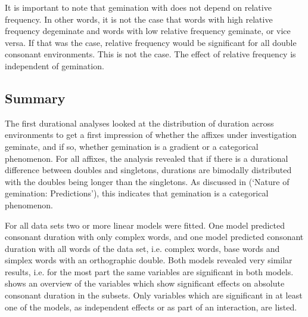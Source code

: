 It is important to note that gemination with  does not depend on relative frequency. In other words, it is not the case that words with high relative frequency degeminate and words with low relative frequency geminate, or vice versa. If that was the case, relative frequency would be significant for all double consonant environments. This is not the case. The effect of relative frequency is independent of gemination. 


\subsection{Summary} \label{discussion experiment}

The first durational analyses looked at the distribution of duration across environments to get a first impression of whether the affixes under investigation geminate, and if so, whether gemination is a gradient or a categorical phenomenon. 
For all affixes,  the analysis revealed that if there is a durational difference between doubles and singletons, durations are bimodally distributed with the doubles being longer than the singletons. As discussed in  (`Nature of gemination: Predictions'), this indicates that gemination is a categorical phenomenon.

For all data sets two or more linear models were fitted. One model predicted consonant duration with only complex words, and one model predicted consonant duration with all words of the data set, i.e. complex words, base words and simplex words with an orthographic double. 
Both models revealed very similar results, i.e. for the most part the same variables are significant in both models.
 shows an overview of the variables which show significant effects on absolute consonant duration in the subsets. Only variables which are significant in at least one of the models, as independent effects or as part of an interaction, are listed. 



